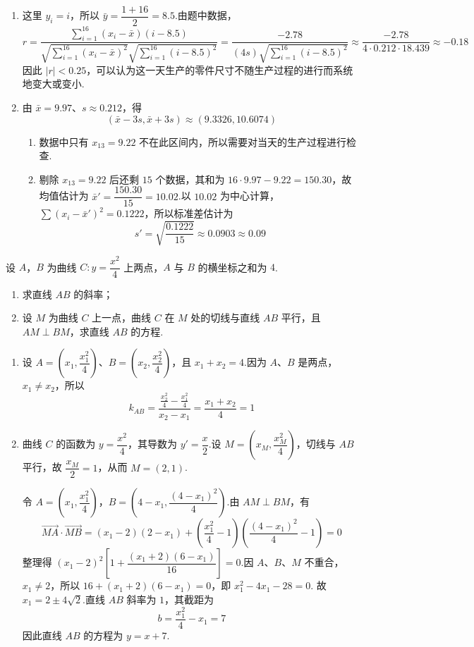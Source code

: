 \begin{solution}
\begin{enumerate}
\item 这里 \(y_i=i\)，所以 \(\bar y=\dfrac{1+16}{2}=8.5\).由题中数据，
\[
r=\frac{\sum_{i=1}^{16}(x_i-\bar x)(i-8.5)}
{\sqrt{\sum_{i=1}^{16}(x_i-\bar x)^2}\sqrt{\sum_{i=1}^{16}(i-8.5)^2}}
=\frac{-2.78}{(4s)\sqrt{\sum_{i=1}^{16}(i-8.5)^2}}
\approx\frac{-2.78}{4\cdot0.212\cdot18.439}\approx-0.18
\]
因此 \(\lvert r\rvert<0.25\)，可以认为这一天生产的零件尺寸不随生产过程的进行而系统地变大或变小.
\item 由 \(\bar x=9.97\)、\(s\approx0.212\)，得
\[
(\bar x-3s,\bar x+3s)\approx(9.3326,10.6074)
\]
\begin{enumerate}
\item 数据中只有 \(x_{13}=9.22\) 不在此区间内，所以需要对当天的生产过程进行检查.
\item 剔除 \(x_{13}=9.22\) 后还剩 \(15\) 个数据，其和为 \(16\cdot9.97-9.22=150.30\)，故均值估计为 \(\bar x'=\dfrac{150.30}{15}=10.02\).以 \(10.02\) 为中心计算，\(\sum(x_i-\bar x')^2=0.1222\)，所以标准差估计为
\[
s'=\sqrt{\frac{0.1222}{15}}\approx0.0903\approx0.09
\]
\end{enumerate}
\end{enumerate}
\end{solution}


\begin{problem}
设 \(A\)，\(B\) 为曲线 \(C:y=\dfrac{x^2}{4}\) 上两点，\(A\) 与 \(B\) 的横坐标之和为 \(4\).

\begin{enumerate}
\item 求直线 \(AB\) 的斜率；
\item 设 \(M\) 为曲线 \(C\) 上一点，曲线 \(C\) 在 \(M\) 处的切线与直线 \(AB\) 平行，且 \(AM\perp BM\)，求直线 \(AB\) 的方程.
\end{enumerate}
\end{problem}

\begin{solution}
\begin{enumerate}
\item 设 \(A=(x_1,\dfrac{x_1^2}{4})\)、\(B=(x_2,\dfrac{x_2^2}{4})\)，且 \(x_1+x_2=4\).因为 \(A\)、\(B\) 是两点，\(x_1\ne x_2\)，所以
\[
k_{AB}=\frac{\frac{x_2^2}{4}-\frac{x_1^2}{4}}{x_2-x_1}
=\frac{x_1+x_2}{4}=1
\]
\item 曲线 \(C\) 的函数为 \(y=\dfrac{x^2}{4}\)，其导数为 \(y'=\dfrac{x}{2}\).设 \(M=(x_M,\dfrac{x_M^2}{4})\)，切线与 \(AB\) 平行，故 \(\dfrac{x_M}{2}=1\)，从而 \(M=(2,1)\).

令 \(A=(x_1,\dfrac{x_1^2}{4})\)，\(B=(4-x_1,\dfrac{(4-x_1)^2}{4})\).由 \(AM\perp BM\)，有
\[
\overrightarrow{MA}\cdot\overrightarrow{MB}
=(x_1-2)\left(2-x_1\right)
+\left(\frac{x_1^2}{4}-1\right)
\left(\frac{(4-x_1)^2}{4}-1\right)=0
\]
整理得 \((x_1-2)^2\left[1+\dfrac{(x_1+2)(6-x_1)}{16}\right]=0\).因 \(A\)、\(B\)、\(M\) 不重合，\(x_1\ne2\)，所以
\(16+(x_1+2)(6-x_1)=0\)，即 \(x_1^2-4x_1-28=0\).
故 \(x_1=2\pm4\sqrt2\).直线 \(AB\) 斜率为 \(1\)，其截距为
\[
b=\frac{x_1^2}{4}-x_1=7
\]
因此直线 \(AB\) 的方程为 \(y=x+7\).
\end{enumerate}
\end{solution}


